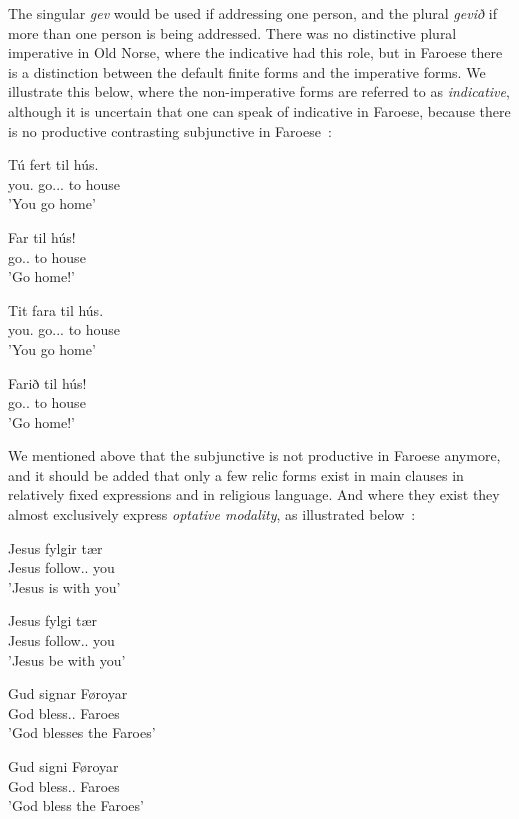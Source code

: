 \documentclass[12pt,%
    times,
]{lin-v2/lin}
\begin{document}
The singular \emph{gev} would be used if addressing one person, and the plural \emph{gevið} if more than one person
is being addressed. There was no distinctive plural imperative in Old Norse, where the \Second\Pl{} indicative had this role,
but in Faroese there is a distinction between the default finite forms and the imperative forms. We illustrate this below,
where the non-imperative forms are referred to as \emph{indicative}, although it is uncertain that one can speak of indicative
in Faroese, because there is no productive contrasting subjunctive in Faroese~\citep[67-68]{faroese}:
\begin{exe}
    \ex
    \begin{xlist}
        \item \gll Tú fert til hús.\\
        you.\Second\Sg{} go.\Second\Sg.\Prs.\Ind{} to house\\
        \trans 'You go home'
        \item \gll Far til hús!\\
        go.\Second\Sg.\Imp{} to house\\
        \trans 'Go home!'
        \item \gll Tit fara til hús.\\
        you.\Second\Pl{} go.\Second\Pl.\Prs.\Ind{} to house\\
        \trans 'You go home'
        \item \gll Farið til hús!\\
        go.\Second\Pl.\Imp{} to house\\
        \trans 'Go home!'
    \end{xlist}
\end{exe}

We mentioned above that the subjunctive is not productive in Faroese anymore, and it should be added that only
a few relic forms exist in main clauses in relatively fixed expressions and in religious language. And where they
exist they almost exclusively express \emph{optative modality}, as illustrated below~\citep[68]{faroese}:
\begin{exe}
    \ex
    \begin{xlist}
        \item \gll Jesus fylgir tær\\
        Jesus follow.\Third\Sg.\Ind{} you\\
        \trans 'Jesus is with you'
        \item \gll Jesus fylgi tær\\
        Jesus follow.\Third\Sg.\Subj{} you\\
        \trans 'Jesus be with you' 
        \item \gll Gud signar Føroyar\\
        God bless.\Third\Pl.\Ind{} Faroes\\
        \trans 'God blesses the Faroes'
        \item \gll Gud signi Føroyar\\
        God bless.\Third\Pl.\Subj{} Faroes\\
        \trans 'God bless the Faroes'
    \end{xlist}
\end{exe}
\end{document}
